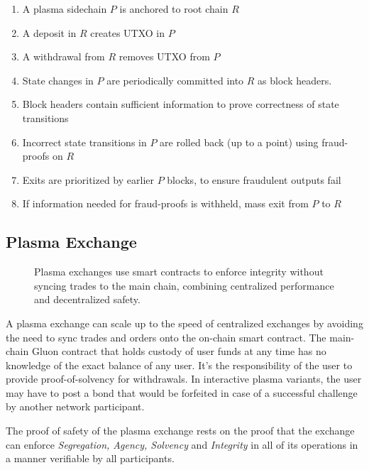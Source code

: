 \documentclass[12pt,a4paper]{article}
\begin{document}
\begin{enumerate}
    \item A plasma sidechain $P$ is anchored to root chain $R$
    \item A deposit in $R$ creates UTXO in $P$
    \item A withdrawal from $R$ removes UTXO from $P$
    \item State changes in $P$ are periodically committed into $R$ as block headers.
    \item Block headers contain sufficient information to prove correctness of state transitions
    \item Incorrect state transitions in $P$ are rolled back (up to a point) using fraud-proofs on $R$
    \item Exits are prioritized by earlier $P$ blocks, to ensure fraudulent outputs fail
    \item If information needed for fraud-proofs is withheld, mass exit from $P$ to $R$
\end{enumerate}

\subsection{Plasma Exchange}
\begin{figure}[ht]
\begin{center}

\end{center}
\caption{Plasma exchanges use smart contracts to enforce integrity without syncing trades to the main chain, combining centralized performance and decentralized safety.}
\end{figure}

A plasma exchange can scale up to the speed of centralized exchanges by avoiding the need to sync trades and orders onto the on-chain smart contract. The main-chain Gluon contract that holds custody of user funds at any time has no knowledge of the exact balance of any user. It’s the responsibility of the user to provide proof-of-solvency for withdrawals. In interactive plasma variants, the user may have to post a bond that would be forfeited in case of a successful challenge by another network participant.

The proof of safety of the plasma exchange rests on the proof that the exchange can enforce \emph{Segregation, Agency, Solvency} and \emph{Integrity} in all of its operations in a manner verifiable by all participants.
\end{document}
